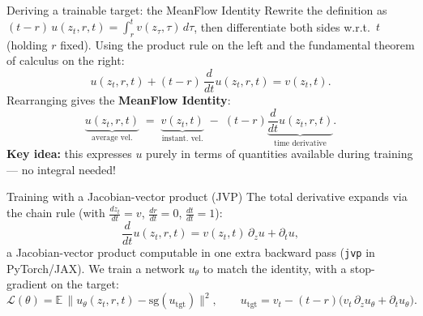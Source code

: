 \documentclass{beamer}
\begin{document}
\begin{frame}{Deriving a trainable target: the MeanFlow Identity}
Rewrite the definition as $(t-r)\,u(z_t,r,t) = \int_r^t v(z_\tau,\tau)\,d\tau$, then differentiate both sides w.r.t.\ $t$ (holding $r$ fixed). Using the product rule on the left and the fundamental theorem of calculus on the right:
\[
u(z_t,r,t) + (t-r)\, \frac{d}{dt}u(z_t,r,t) = v(z_t,t).
\]
Rearranging gives the \textbf{MeanFlow Identity}:
\[
\underbrace{u(z_t,r,t)}_{\text{average vel.}} \;=\; \underbrace{v(z_t,t)}_{\text{instant. vel.}} \;-\; (t-r)\underbrace{\frac{d}{dt}u(z_t,r,t)}_{\text{time derivative}}.
\]
\textbf{Key idea:} this expresses $u$ purely in terms of quantities available during training --- no integral needed!
\end{frame}

\begin{frame}{Training with a Jacobian-vector product (JVP)}
The total derivative expands via the chain rule (with $\frac{dz_t}{dt}=v$, $\frac{dr}{dt}=0$, $\frac{dt}{dt}=1$):
\[
\frac{d}{dt}u(z_t,r,t) = v(z_t,t)\,\partial_z u + \partial_t u,
\]
a Jacobian-vector product computable in one extra backward pass (\texttt{jvp} in PyTorch/JAX). We train a network $u_\theta$ to match the identity, with a stop-gradient on the target:
\[
\mathcal{L}(\theta) = \mathbb{E}\, \big\| u_\theta(z_t,r,t) - \text{sg}(u_{\text{tgt}}) \big\|^2, \qquad
u_{\text{tgt}} = v_t - (t-r)\big(v_t\,\partial_z u_\theta + \partial_t u_\theta\big).
\]
\vspace{-4mm}
\begin{center}
\end{center}
\end{frame}
\end{document}

